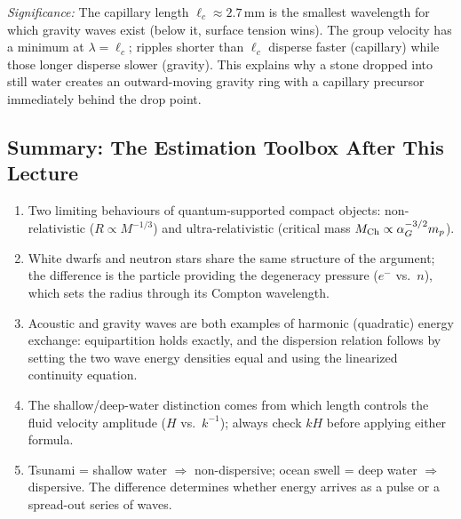 
\textit{Significance:} The capillary length $\ell_c\approx2.7\,\text{mm}$ is
the smallest wavelength for which gravity waves exist (below it, surface
tension wins). The group velocity has a minimum at $\lambda=\ell_c$; ripples
shorter than $\ell_c$ disperse faster (capillary) while those longer disperse
slower (gravity). This explains why a stone dropped into still water creates an
outward-moving gravity ring with a capillary precursor immediately behind the
drop point.

\subsection{Summary: The Estimation Toolbox After This Lecture}
\label{sec:lec10:summary}

\begin{enumerate}
    \item Two limiting behaviours of quantum-supported compact objects:
    non-relativistic ($R\propto M^{-1/3}$) and ultra-relativistic (critical
    mass $M_{\rm Ch}\propto\alpha_G^{-3/2}m_p$).
    \item White dwarfs and neutron stars share the same structure of the
    argument; the difference is the particle providing the degeneracy pressure
    ($e^-$ vs.\ $n$), which sets the radius through its Compton wavelength.
    \item Acoustic and gravity waves are both examples of harmonic (quadratic)
    energy exchange: equipartition holds exactly, and the dispersion relation
    follows by setting the two wave energy densities equal and using the
    linearized continuity equation.
    \item The shallow/deep-water distinction comes from which length controls
    the fluid velocity amplitude ($H$ vs.\ $k^{-1}$); always check $kH$ before
    applying either formula.
    \item Tsunami = shallow water $\Rightarrow$ non-dispersive; ocean swell =
    deep water $\Rightarrow$ dispersive. The difference determines whether
    energy arrives as a pulse or a spread-out series of waves.
\end{enumerate}

